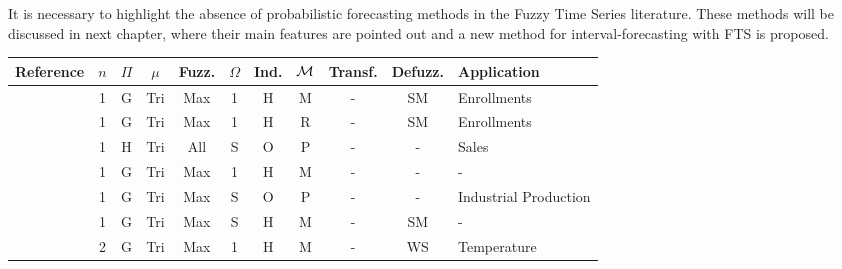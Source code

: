 It is necessary to highlight the absence of probabilistic forecasting methods in the Fuzzy Time Series literature. These methods will be discussed in next chapter, where their main features are pointed out and a new method for interval-forecasting with FTS is proposed. 

\begin{center}
    \begin{landscape}
\begin{longtable}[c]{|m{4cm}|c|c|c|c|c|c|c|c|c|m{5cm}|} \hline
\textbf{Reference}   & $n$ & $\Pi$ & $\mu$ & \textbf{Fuzz.} & $\Omega$ & \textbf{Ind.} & \textbf{$\mathcal{M}$}      & \textbf{Transf.} & \textbf{Defuzz.} & \textbf{Application}  \\ \hline \hline
\endhead
%
\cite{song1993fuzzy}      & 1                  & G                  & Tri  & Max                & 1              & H                       & M              & -                        & SM              & Enrollments           \\ \hline
\cite{chen1996forecasting} & 1                  & G                  & Tri  & Max                & 1              & H                       & R               & -                        & SM              & Enrollments           \\ \hline
\cite{Chang1997}           & 1                  & H             & Tri  & All                    & S       & O                    & P          & -                        & -                        & Sales                 \\ \hline
\cite{Song1997}            & 1                  & G                  & Tri  & Max                & 1              & H                       & M              & -                        & -                        & -                     \\ \hline
\cite{Tseng1999}           & 1                  & G                  & Tri  & Max                & S       & O                   & P           & -                        & -                        & Industrial Production \\ \hline
\cite{Song1999}            & 1                  & G                  & Tri  & Max                & S       & H                       & M              & -                        & SM              & -                     \\ \hline
\cite{Chen2000}            & 2                  & G                  & Tri  & Max                & 1              & H                       & M              & -                        & WS            & Temperature           \\ \hline

\end{longtable}
\end{landscape}
\end{center}
